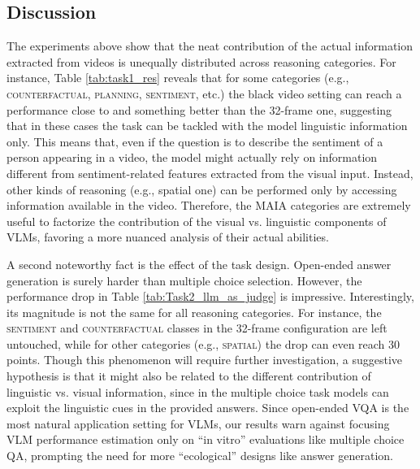 






\subsection{Discussion}

The experiments above show that the neat contribution of the actual information extracted from videos is unequally distributed across reasoning categories. For instance, Table \ref{tab:task1_res} reveals that for some categories (e.g., \textsc{counterfactual}, \textsc{planning}, \textsc{sentiment}, etc.) the black video setting can reach a performance close to and something better than the 32-frame one, suggesting that in these cases the task can  be tackled with the model linguistic information only. This means that, even if the question is to describe the sentiment of a person appearing in a video, the model might actually rely on information different from sentiment-related features extracted from the visual input. Instead, other kinds of reasoning (e.g., spatial one) can be performed only by accessing information available in the video. Therefore, the MAIA categories are extremely useful to factorize the contribution of the visual vs. linguistic components of VLMs, favoring a more nuanced analysis of their actual abilities.

A second noteworthy fact is the effect of the task design. Open-ended answer generation is surely harder than multiple choice selection. However, the performance drop in Table \ref{tab:Task2_llm_as_judge} is impressive. Interestingly, its magnitude is not the same for all reasoning categories. For instance, the \textsc{sentiment} and \textsc{counterfactual} classes in the 32-frame configuration are left untouched, while for other categories (e.g., \textsc{spatial}) the drop can even reach 30 points. Though this phenomenon will require further investigation, a suggestive hypothesis is that it might also be related to the different contribution of linguistic vs. visual information, since in the multiple choice task models can exploit the linguistic cues in the provided answers. Since open-ended VQA is the most natural application setting for VLMs, our results warn against focusing VLM performance estimation only on ``in vitro'' evaluations like multiple choice QA, prompting the need for more ``ecological'' designs like answer generation.   






















